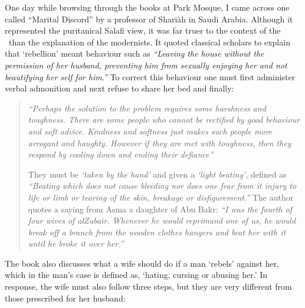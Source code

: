 \documentclass[12pt]{memoir}
\begin{document}
One day while browsing through the books
at  Park Mosque,
I came across one called “Marital Discord”
by a professor of Shari\`ah in Saudi Arabia.
Although it represented the puritanical Salafi view,
it was far truer to the context of the \Quran\
than the explanation of the modernists.
It quoted classical scholars to explain that ‘rebellion’ meant behaviour
such as \emph{“Leaving the house without the permission of her husband,
preventing him from sexually enjoying her
and not beautifying her self for him.”}
To correct this behaviour one must first administer verbal admonition
and next refuse to share her bed and finally:

\begin{quote}
\emph{%
“Perhaps the solution to the problem requires some harshness and toughness.
There are some people who cannot be rectified
by good behaviour and soft advice.
Kindness and softness just makes such people more arrogant and haughty.
However if they are met with toughness,
then they respond by cooling down and ending their defiance”}

They must be \emph{‘taken by the hand’}
and given a \emph{‘light beating’}, defined as
\emph{“Beating which does not cause bleeding nor does one fear from it
injury to life or limb or tearing of the skin, breakage or disfigurement.”}
The author quotes a saying from Asma a daughter of Abu Bakr:
\emph{“I was the fourth of four wives of al\–Zubair.
Whenever he would reprimand one of us,
he would break off a branch from the wooden clothes hangers
and beat her with it until he broke it over her.”}
\end{quote}

The book also discusses what a wife should do if a man ‘rebels’ against her,
which in the man’s case is defined as, ‘hating, cursing or abusing her.’
In response, the wife must also follow three steps,
but they are very different from those prescribed for her husband:
\end{document}
